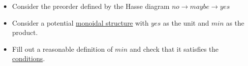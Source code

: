 \begin{itemize}
    \item  Consider the preorder defined by the Hasse diagram $\boxed{no \rightarrow maybe \rightarrow yes}$
    \item Consider a potential \href{doc/1 math/Seven Sketches in Compositionality/Chapter 2: Resource theories/2 Symmetric monoidal preorders/1 Definition and first examples/1 Symmetric monoidal structure on a preorder}{monoidal structure} with $yes$ as the unit and $min$ as the product.
    \item Fill out a reasonable definition of $min$ and check that it satisfies the \href{doc/1 math/Seven Sketches in Compositionality/Chapter 2: Resource theories/2 Symmetric monoidal preorders/1 Definition and first examples/1 Symmetric monoidal structure on a preorder}{conditions}.
  \end{itemize}